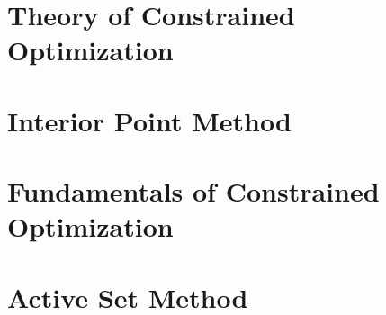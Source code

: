 \documentclass[11pt]{article}
\begin{document}
    \section{Theory of Constrained Optimization} \label{sec: chap12}
    
    \section{Interior Point Method} \label{sec: chap14}
    
    \section{Fundamentals of Constrained Optimization} \label{sec: chap15}
    

    \section{Active Set Method} \label{sec: chap16}
    
\end{document}
